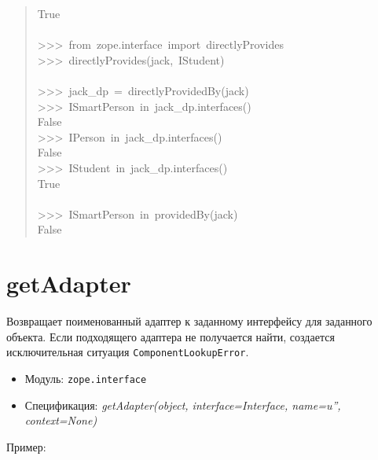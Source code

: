 \documentclass[14pt,a4paper,openany,twoside,final]{extbook}
\providecommand*{\DUroletitlereference}[1]{\textsl{#1}}
\begin{document}
\begin{quote}
{True\\
~\\
>{}>{}>~from~zope.interface~import~directlyProvides\\
>{}>{}>~directlyProvides(jack,~IStudent)\\
~\\
>{}>{}>~jack\_dp~=~directlyProvidedBy(jack)\\
>{}>{}>~ISmartPerson~in~jack\_dp.interfaces()\\
False\\
>{}>{}>~IPerson~in~jack\_dp.interfaces()\\
False\\
>{}>{}>~IStudent~in~jack\_dp.interfaces()\\
True\\
~\\
>{}>{}>~ISmartPerson~in~providedBy(jack)\\
False
}
\end{quote}


\section*{getAdapter%
  \label{getadapter}%
}

Возвращает поименованный адаптер к заданному интерфейсу для заданного
объекта.  Если подходящего адаптера не получается найти, создается
исключительная ситуация \texttt{ComponentLookupError}.

\begin{itemize}

\item Модуль: \texttt{zope.interface}

\item Спецификация: \DUroletitlereference{getAdapter(object, interface=Interface, name=u'', context=None)}

\end{itemize}

Пример:
\end{document}
